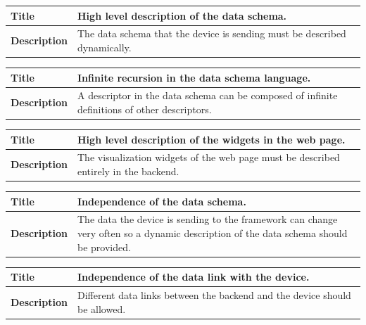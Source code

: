 \documentclass[12pt]{article}
\begin{document}
                \begin{tabularx}{\textwidth}{|l|X|}
                    \hline
                    \textbf{Title} & High level description of the data schema.\\
                    \hline
                    \textbf{Description} & The data schema that the device is
                    sending must be described dynamically. \\
                    \hline
                \end{tabularx}

                \begin{tabularx}{\textwidth}{|l|X|}
                    \hline
                    \textbf{Title} & Infinite recursion in the data schema
                    language. \\
                    \hline
                    \textbf{Description} & A descriptor in the data schema can
                    be composed of infinite definitions of other descriptors. \\
                    \hline
                \end{tabularx}

                \begin{tabularx}{\textwidth}{|l|X|}
                    \hline
                    \textbf{Title} & High level description of the widgets in
                    the web page. \\
                    \hline
                    \textbf{Description} & The visualization widgets of the web
                    page must be described entirely in the backend. \\
                    \hline
                \end{tabularx}

                \begin{tabularx}{\textwidth}{|l|X|}
                    \hline
                    \textbf{Title} & Independence of the data schema. \\
                    \hline
                    \textbf{Description} & The data the device is sending to the
                    framework can change very often so a dynamic description of
                    the data schema should be provided. \\
                    \hline
                \end{tabularx}

                \begin{tabularx}{\textwidth}{|l|X|}
                    \hline
                    \textbf{Title} & Independence of the data link with the
                    device. \\
                    \hline
                    \textbf{Description} & Different data links between the
                    backend and the device should be allowed. \\
                    \hline
                \end{tabularx}
\end{document}
